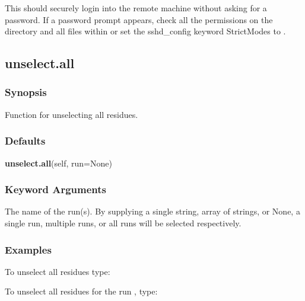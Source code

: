 
This should securely login into the remote machine without asking for a password.  If a password prompt appears, check all the permissions on the directory  and all files within or set the sshd\_config keyword StrictModes to .







\newpage

\subsection{unselect.all}


\subsubsection{Synopsis}

Function for unselecting all residues.



\subsubsection{Defaults}

\textsf{\textbf{unselect.all}(self, run=None)}


\subsubsection{Keyword Arguments}

  The name of the run(s).  By supplying a single string, array of strings, or None, a single run, multiple runs, or all runs will be selected respectively. 




\subsubsection{Examples}

To unselect all residues type:



To unselect all residues for the run , type:



